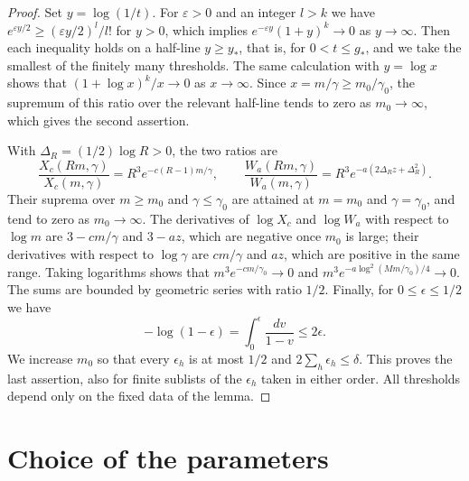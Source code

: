 \begin{proof}
Set $y=\log(1/t)$. For $\varepsilon>0$ and an integer $l>k$ we have $e^{\varepsilon y/2}\ge(\varepsilon y/2)^l/l!$ for $y>0$, which implies $e^{-\varepsilon y}(1+y)^k\to0$ as $y\to\infty$. Then each inequality holds on a half-line $y\ge y_*$, that is, for $0<t\le g_*$, and we take the smallest of the finitely many thresholds. The same calculation with $y=\log x$ shows that $(1+\log x)^k/x\to0$ as $x\to\infty$. Since $x=m/\gamma\ge m_0/\gamma_0$, the supremum of this ratio over the relevant half-line tends to zero as $m_0\to\infty$, which gives the second assertion.

With $\Delta_R=(1/2)\log R>0$, the two ratios are
\begin{equation}\label{ch20:eq:tail-ratios}
 \frac{X_c(Rm,\gamma)}{X_c(m,\gamma)}=R^3e^{-c(R-1)m/\gamma},\qquad
 \frac{W_a(Rm,\gamma)}{W_a(m,\gamma)}=R^3e^{-a(2\Delta_Rz+\Delta_R^2)}.
\end{equation}
Their suprema over $m\ge m_0$ and $\gamma\le\gamma_0$ are attained at $m=m_0$ and $\gamma=\gamma_0$, and tend to zero as $m_0\to\infty$. The derivatives of $\log X_c$ and $\log W_a$ with respect to $\log m$ are $3-cm/\gamma$ and $3-az$, which are negative once $m_0$ is large; their derivatives with respect to $\log\gamma$ are $cm/\gamma$ and $az$, which are positive in the same range. Taking logarithms shows that $m^3e^{-cm/\gamma_0}\to0$ and $m^3e^{-a\log^2(Mm/\gamma_0)/4}\to0$. The sums are bounded by geometric series with ratio $1/2$. Finally, for $0\le\epsilon\le1/2$ we have
\[
 -\log(1-\epsilon)=\int_0^\epsilon\frac{dv}{1-v}\le2\epsilon.
\]
We increase $m_0$ so that every $\epsilon_h$ is at most $1/2$ and $2\sum_h\epsilon_h\le\delta$. This proves the last assertion, also for finite sublists of the $\epsilon_h$ taken in either order. All thresholds depend only on the fixed data of the lemma.
\end{proof}

\section{Choice of the parameters}\label{ch20:sec:parameters}

